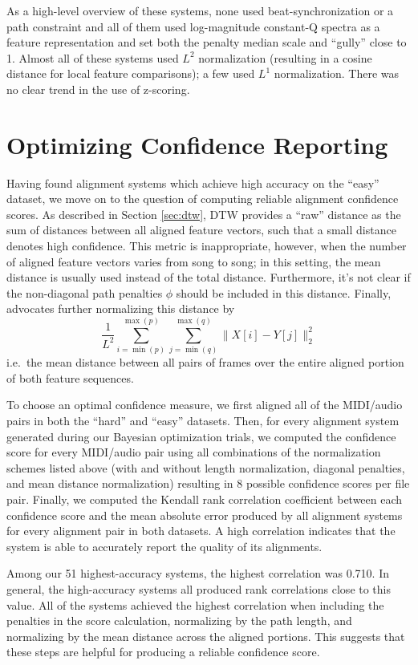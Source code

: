 \documentclass{article}
\begin{document}
As a high-level overview of these systems, none used beat-synchronization or a path constraint and all of them used log-magnitude constant-Q spectra as a feature representation and set both the penalty median scale and ``gully'' close to 1.
Almost all of these systems used $L^2$ normalization (resulting in a cosine distance for local feature comparisons); a few used $L^1$ normalization.
There was no clear trend in the use of z-scoring.

\section{Optimizing Confidence Reporting}
\label{sec:confidence}

Having found alignment systems which achieve high accuracy on the ``easy'' dataset, we move on to  the question of computing reliable alignment confidence scores.
As described in Section \ref{sec:dtw}, DTW provides a ``raw'' distance as the sum of distances between all aligned feature vectors, such that a small distance denotes high confidence.
This metric is inappropriate, however, when the number of aligned feature vectors varies from song to song; in this setting, the mean distance is usually used instead of the total distance.
Furthermore, it's not  clear if the non-diagonal path penalties $\phi$ should be included in this distance.
Finally, \cite{raffel2015large} advocates further normalizing this distance by
$$
\frac{1}{L^2} \sum_{i = \min(p)}^{\max(p)} \sum_{j = \min(q)}^{\max(q)} \|X[i] - Y[j]\|_2^2
$$
i.e.\ the mean distance between all pairs of frames over the entire aligned portion of both feature sequences.

To choose an optimal confidence measure, we first aligned all of the MIDI/audio pairs in both the ``hard'' and ``easy'' datasets.
Then, for every alignment system generated during our Bayesian optimization trials, we computed the confidence score for every MIDI/audio pair using all combinations of the normalization schemes listed above (with and without length normalization, diagonal penalties, and mean distance normalization) resulting in 8 possible confidence scores per file pair.
Finally, we computed the Kendall rank correlation coefficient \cite{kendall1938new} between each confidence score and the mean absolute error produced by all alignment systems for every alignment pair in both datasets.
A high correlation indicates that the system is able to accurately report the quality of its alignments.

Among our 51 highest-accuracy systems, the highest correlation was 0.710.
In general, the high-accuracy systems all produced rank correlations close to this value.
All of the systems achieved the highest correlation when including the penalties in the score calculation, normalizing by the path length, and normalizing by the mean distance across the aligned portions.
This suggests that these steps are helpful for producing a reliable confidence score.
\end{document}
